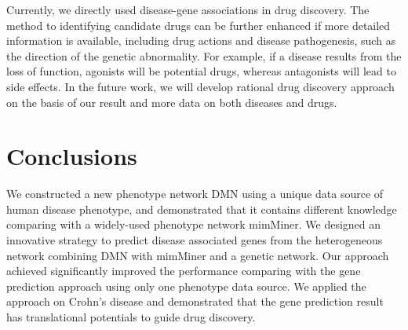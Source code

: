 Currently, we directly used disease-gene associations in drug discovery.
The method to identifying candidate drugs can be further enhanced if more detailed information is available,
including drug actions and disease pathogenesis, such as the direction of the genetic abnormality.
For example, if a disease results from the loss of function,
agonists will be potential drugs, whereas antagonists will lead to side effects.
In the future work, we will develop rational drug discovery approach
on the basis of our result and more data on both diseases and drugs.

\section{Conclusions}
We constructed a new phenotype network DMN
using a unique data source of human disease phenotype,
and demonstrated that it contains different knowledge comparing
with a widely-used phenotype network mimMiner.
We designed an innovative strategy to predict disease associated genes
from the heterogeneous network combining DMN with
mimMiner and a genetic network.
Our approach achieved significantly improved the performance
comparing with the gene prediction approach using only one phenotype
data source.
We applied the approach on Crohn's disease and demonstrated that the gene prediction result
has translational potentials to guide drug discovery.
